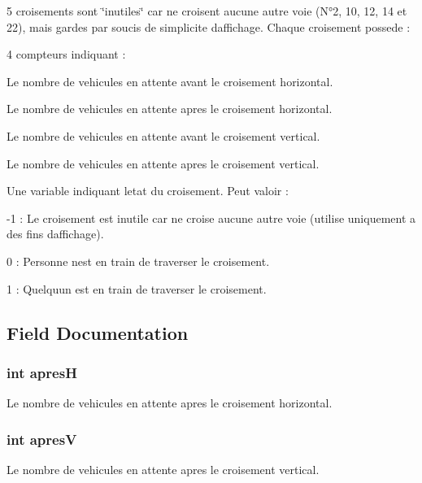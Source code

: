 5 croisements sont \char`\"{}inutiles\char`\"{} car ne croisent aucune autre voie (N°2, 10, 12, 14 et 22), mais gardes par soucis de simplicite d\textquotesingle{}affichage. Chaque croisement possede \+:
\begin{DoxyItemize}
\item 4 compteurs indiquant \+:
\begin{DoxyItemize}
\item Le nombre de vehicules en attente avant le croisement horizontal.
\item Le nombre de vehicules en attente apres le croisement horizontal.
\item Le nombre de vehicules en attente avant le croisement vertical.
\item Le nombre de vehicules en attente apres le croisement vertical.
\end{DoxyItemize}
\item Une variable indiquant l\textquotesingle{}etat du croisement. Peut valoir \+:
\begin{DoxyItemize}
\item -\/1 \+: Le croisement est inutile car ne croise aucune autre voie (utilise uniquement a des fins d\textquotesingle{}affichage).
\item 0 \+: Personne n\textquotesingle{}est en train de traverser le croisement.
\item 1 \+: Quelqu\textquotesingle{}un est en train de traverser le croisement. 
\end{DoxyItemize}
\end{DoxyItemize}

\subsection{Field Documentation}
\hypertarget{struct_croisement_a92825e65e3dc482ea0749873b2669f85}{}
\subsubsection[{apres\+H}]{\setlength{\rightskip}{0pt plus 5cm}int apres\+H}\label{struct_croisement_a92825e65e3dc482ea0749873b2669f85}
Le nombre de vehicules en attente apres le croisement horizontal. \hypertarget{struct_croisement_aedd3f8edd387efe89a1c6f63a25f066a}{}
\subsubsection[{apres\+V}]{\setlength{\rightskip}{0pt plus 5cm}int apres\+V}\label{struct_croisement_aedd3f8edd387efe89a1c6f63a25f066a}
Le nombre de vehicules en attente apres le croisement vertical. \hypertarget{struct_croisement_aec0a573c81b0f7b93447e88cb693c578}{}
